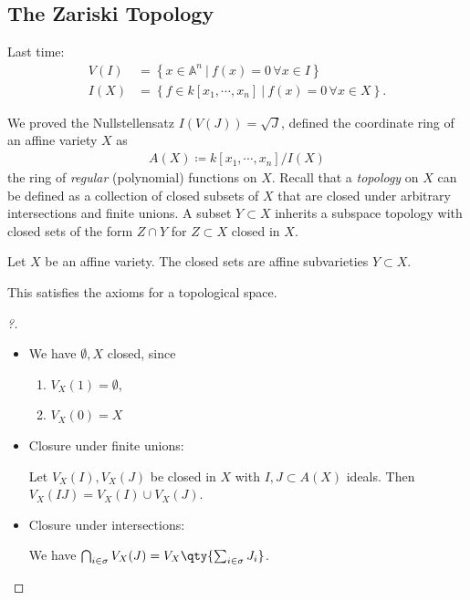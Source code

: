 \hypertarget{the-zariski-topology}{%
\subsection{The Zariski Topology}\label{the-zariski-topology}}

Last time:
\begin{align*}  
V(I) &= \left\{{x\in {\mathbb{A}}^n {~\mathrel{\Big|}~}f(x) = 0 \, \forall x\in I}\right\} \\
I(X) &= \left\{{f\in k[x_1, \cdots, x_n] {~\mathrel{\Big|}~}f(x) = 0\, \forall x\in X}\right\}
.\end{align*}

We proved the Nullstellensatz \(I(V(J)) = \sqrt{J}\), defined the
coordinate ring of an affine variety \(X\) as
\begin{align*}
A(X) \coloneqq k[x_1, \cdots, x_n] / I(X)
\end{align*}
the ring of \emph{regular} (polynomial) functions on \(X\). Recall that
a \emph{topology} on \(X\) can be defined as a collection of closed
subsets of \(X\) that are closed under arbitrary intersections and
finite unions. A subset \(Y\subset X\) inherits a subspace topology with
closed sets of the form \(Z\cap Y\) for \(Z\subset X\) closed in \(X\).

\begin{definition}

Let \(X\) be an affine variety. The closed sets are affine subvarieties
\(Y\subset X\).

\end{definition}

\begin{proposition}

This satisfies the axioms for a topological space.

\end{proposition}

\begin{proof}[?]

\envlist

\begin{itemize}
\item
  We have \(\emptyset, X\) closed, since

  \begin{enumerate}
  \def\labelenumi{\arabic{enumi}.}
  \tightlist
  \item
    \(V_X(1) = \emptyset\),
  \item
    \(V_X(0) = X\)
  \end{enumerate}
\item
  Closure under finite unions:

  Let \(V_X(I), V_X(J)\) be closed in \(X\) with \(I, J \subset A(X)\)
  ideals. Then \(V_X(IJ) = V_X(I) \cup V_X(J)\).
\item
  Closure under intersections:

  We have
  \(\bigcap_{i\in \sigma} V_X(J) = V_X\qty{ \sum_{i\in \sigma} J_i}\).
\end{itemize}

\end{proof}

